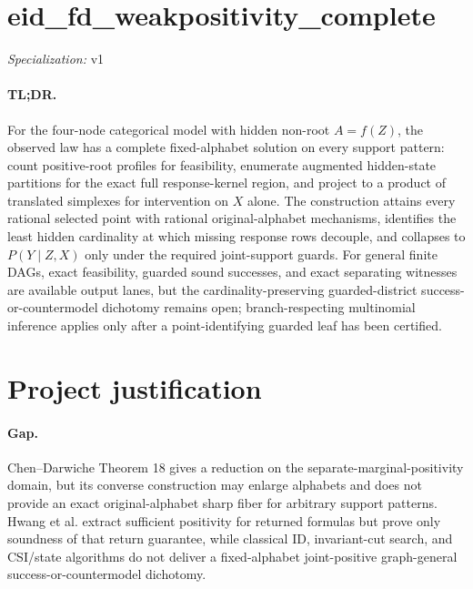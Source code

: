 \documentclass{article}
\begin{document}
\sloppy

\section*{eid\_\allowbreak{}fd\_\allowbreak{}weakpositivity\_\allowbreak{}complete}

\noindent\textit{Specialization:} v1\par

\paragraph{TL;DR.} For the four-node categorical model with hidden non-root \(A=f(Z)\), the observed law has a complete fixed-alphabet solution on every support pattern: count positive-root profiles for feasibility, enumerate augmented hidden-state partitions for the exact full response-kernel region, and project to a product of translated simplexes for intervention on \(X\) alone.  The construction attains every rational selected point with rational original-alphabet mechanisms, identifies the least hidden cardinality at which missing response rows decouple, and collapses to \(P(Y\mid Z,X)\) only under the required joint-support guards.  For general finite DAGs, exact feasibility, guarded sound successes, and exact separating witnesses are available output lanes, but the cardinality-preserving guarded-district success-or-countermodel dichotomy remains open; branch-respecting multinomial inference applies only after a point-identifying guarded leaf has been certified.

\section{Project justification}

\paragraph{Gap.} Chen--Darwiche Theorem 18 gives a reduction on the separate-marginal-positivity domain, but its converse construction may enlarge alphabets and does not provide an exact original-alphabet sharp fiber for arbitrary support patterns.  Hwang et al. extract sufficient positivity for returned formulas but prove only soundness of that return guarantee, while classical ID, invariant-cut search, and CSI/state algorithms do not deliver a fixed-alphabet joint-positive graph-general success-or-countermodel dichotomy.
\end{document}
